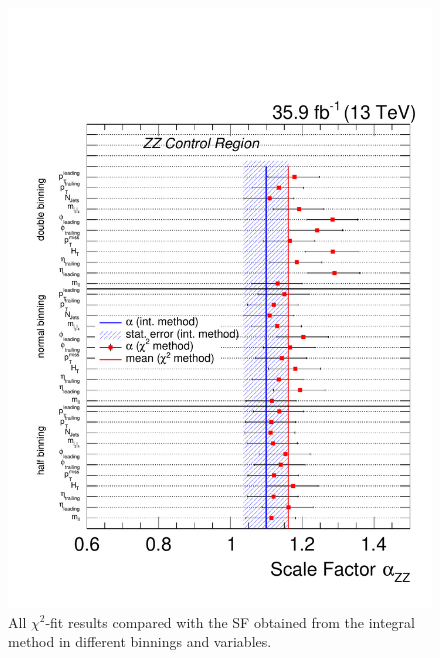 \begin{figure}[tbp]
 \centering
 \includegraphics[width=\pairwidth]{figures/plots_CR/chi/ZZ_Compare}
 \caption{All $\chi^2$-fit results compared with the SF obtained from the integral method in different binnings and variables.}
 \label{fig:chiZZ}
\end{figure}

